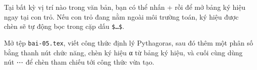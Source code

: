 \begin{meo}
Tại bất kỳ vị trí nào trong văn bản, bạn có thể nhấn + rồi
 để mở bảng ký hiệu ngay tại con trỏ. Nếu con trỏ đang nằm ngoài môi
trường toán, ký hiệu được chèn sẽ tự động bọc trong cặp dấu \texttt{\$…\$}.
\end{meo}

\begin{thuchanh}[Bài 5]
Mở tệp \texttt{bai-05.tex}, viết công thức định lý Pythagoras, sau đó thêm một
phân số bằng thanh nút chức năng, chèn ký hiệu α từ bảng ký hiệu, và cuối cùng
dùng nút ⋯ để chèn tham chiếu tới công thức vừa tạo.
\end{thuchanh}
